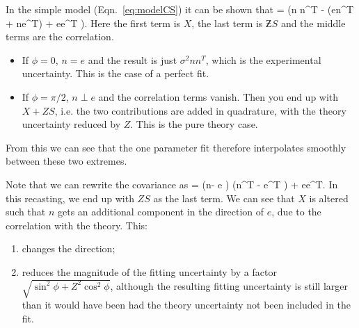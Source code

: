 In the simple model (Eqn.~\ref{eq:modelCS}) it can be shown that
\be 
\Cov[T(\lambda)] =  \bigg(n n^T -  \cos\phi (en^T + ne^T) + ee^T \bigg).
\ee 
Here the first term is $X$, the last term is $\Zbar S$ and the middle terms are the correlation. 
\begin{itemize}
\item If $\phi=0$, $n=e$ and the result is just $\sigma^2 nn^T$, which is the experimental uncertainty. This is the case of a perfect fit.
\item If $\phi=\pi/2$, $n \perp e$ and the correlation terms vanish. Then you end up with $X + ZS$, i.e. the two contributions are added in quadrature, with the theory uncertainty reduced by $Z$. This is the pure theory case.
\end{itemize}
From this we can see that the one parameter fit therefore interpolates smoothly between these two extremes.

Note that we can rewrite the covariance as 
\be 
\Cov[T(\lambda)] =  \bigg(n-  e \bigg) \bigg(n^T -  e^T \bigg) +  ee^T.
\ee
In this recasting, we end up with $ZS$ as the last term. We can see that $X$ is altered such that $n$ gets an additional component in the direction of $e$, due to the correlation with the theory. This:
\begin{enumerate}
\item changes the direction;
\item reduces the magnitude of the fitting uncertainty by a factor $\sqrt{\sin^2 \phi + Z^2 \cos^2 \phi}$, although the resulting fitting uncertainty is still larger than it would have been had the theory uncertainty not been included in the fit.
\end{enumerate}

